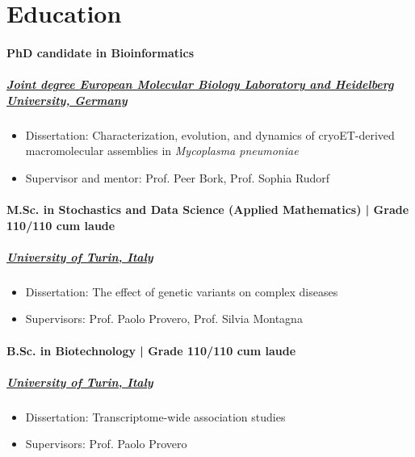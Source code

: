 \documentclass[
	DIV=15,
]{scrartcl}
\begin{document}
\section*{Education}

\paragraph{PhD candidate in Bioinformatics}
\subparagraph{\href{https://embl.org}{Joint degree European Molecular Biology Laboratory and Heidelberg University, Germany}}
\begin{itemize}
	\item Dissertation: Characterization, evolution, and dynamics of cryoET-derived macromolecular assemblies in \textit{Mycoplasma pneumoniae}
	\item Supervisor and mentor: Prof. Peer Bork, Prof. Sophia Rudorf
\end{itemize}

\paragraph{M.Sc. in Stochastics and Data Science (Applied Mathematics) | Grade 110/110 cum laude}
\subparagraph{\href{https://unito.it}{University of Turin, Italy}}
\begin{itemize}
	\item Dissertation: The effect of genetic variants on complex diseases
	\item Supervisors: Prof. Paolo Provero, Prof. Silvia Montagna
\end{itemize}

\paragraph{B.Sc. in Biotechnology | Grade 110/110 cum laude}
\subparagraph{\href{https://unito.it}{University of Turin, Italy}}
\begin{itemize}
	\item Dissertation: Transcriptome-wide association studies
	\item Supervisors: Prof. Paolo Provero
\end{itemize}
\end{document}
